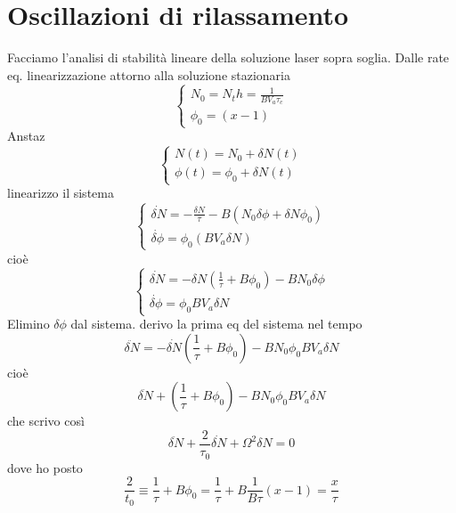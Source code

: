 \documentclass{book}
\theoremstyle{remark}
\begin{document}
\section*{Oscillazioni di rilassamento}
Facciamo l'analisi di stabilità lineare della soluzione laser sopra soglia. Dalle rate eq. linearizzazione attorno alla soluzione stazionaria
\begin{equation*}
\begin{cases}
N_0 = N_th = \frac{1}{BV_a\tau_c}\\
\phi_0 = (x - 1)
\end{cases}
\end{equation*}
Anstaz
\begin{equation*}
\begin{cases}
N(t) = N_0 + \delta N(t)\\
\phi(t) = \phi_0 + \delta N(t)
\end{cases}
\end{equation*}
linearizzo il sistema
\begin{equation*}
\begin{cases}
\dot{\delta N} = -\frac{\delta N}{\tau} - B(N_0 \delta \phi + \delta N \phi_0)\\
\dot{\delta \phi} = \phi_0(BV_a \delta N)
\end{cases}
\end{equation*}
cioè
\begin{equation*}
\begin{cases}
\dot{\delta N} = -\delta N \left(\frac{1}{\tau} + B\phi_0\right) - BN_0 \delta \phi\\
\dot{\delta \phi} = \phi_0 BV_a \delta N
\end{cases}
\end{equation*}
Elimino $\delta\phi$ dal sistema. derivo la prima eq del sistema nel tempo
\begin{equation*}
\ddot{\delta N} = -\dot{\delta N} \left(\frac{1}{\tau} + B\phi_0\right) - BN_0\phi_0BV_a \delta N
\end{equation*}
cioè
\begin{equation*}
\ddot{\delta N} + \left(\frac{1}{\tau} + B\phi_0\right) - BN_0\phi_0BV_a \delta N
\end{equation*}
che scrivo così
\begin{equation*}
\ddot{\delta N} + \frac{2}{\tau_0} \dot{\delta N} + \Omega^2 \delta N = 0
\end{equation*}
dove ho posto
\begin{equation*}
\frac{2}{t_0} \equiv \frac{1}{\tau} + B\phi_0 = \frac{1}{\tau} + B\frac{1}{B\tau}(x-1)= \frac{x}{\tau}
\end{equation*}
\end{document}
